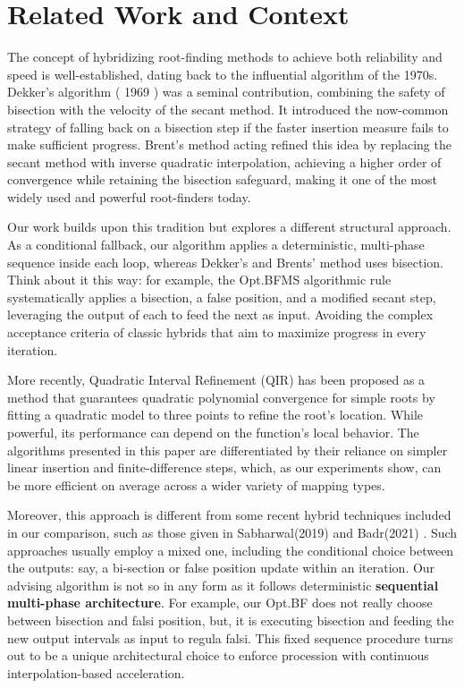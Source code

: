 \documentclass[amsmath, amssymb, aps]{revtex4-2}
\begin{document}
\section{Related Work and Context}\label{sec:related_work}

The concept of hybridizing root-finding methods to achieve both reliability and speed is well-established, dating back to the influential algorithm of the 1970s. Dekker's algorithm ( 1969 ) was a seminal contribution, combining the safety of bisection with the velocity of the secant method. It introduced the now-common strategy of falling back on a bisection step if the faster insertion measure fails to make sufficient progress. Brent's method acting \cite{brent1973algorithms} refined this idea by replacing the secant method with inverse quadratic interpolation, achieving a higher order of convergence while retaining the bisection safeguard, making it one of the most widely used and powerful root-finders today.

Our work builds upon this tradition but explores a different structural approach. As a conditional fallback, our algorithm applies a deterministic, multi-phase sequence inside each loop, whereas Dekker's and Brents' method uses bisection. Think about it this way: for example, the Opt.BFMS algorithmic rule systematically applies a bisection, a false position, and a modified secant step, leveraging the output of each to feed the next as input. Avoiding the complex acceptance criteria of classic hybrids that aim to maximize progress in every iteration.

More recently, Quadratic Interval Refinement (QIR) \cite{abbott2014quadratic} has been proposed as a method that guarantees quadratic polynomial convergence for simple roots by fitting a quadratic model to three points to refine the root's location. While powerful, its performance can depend on the function's local behavior. The algorithms presented in this paper are differentiated by their reliance on simpler linear insertion and finite-difference steps, which, as our experiments show, can be more efficient on average across a wider variety of mapping types. 

Moreover, this approach is different from some recent hybrid techniques included in our comparison, such as those given in Sabharwal(2019) \cite{sabharwal2019blended} and Badr(2021) \cite{badr2021comparative}. Such approaches usually employ a mixed one, including the conditional choice between the outputs: say, a bi-section or false position update within an iteration. Our advising algorithm is not so in any form as it follows deterministic \textbf{sequential multi-phase architecture}. For example, our Opt.BF does not really choose between bisection and falsi position, but, it is executing bisection and feeding the new output intervals as input to regula falsi. This fixed sequence procedure turns out to be a unique architectural choice to enforce procession with continuous interpolation-based acceleration.
\end{document}
